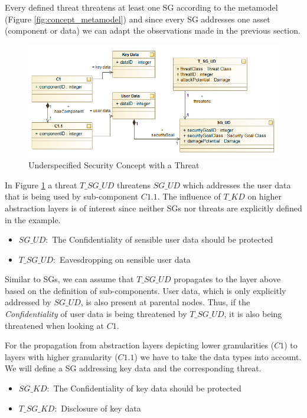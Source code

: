 Every defined threat threatens at least one SG according to the metamodel (Figure \ref{fig:concept_metamodel}) and since every SG addresses one asset (component or data) we can adapt the observations made in the previous section. 

\begin{figure}[H]
\centering
\includegraphics[scale=0.85]{pictures/threat_overview.png}
\caption{Underspecified Security Concept with a Threat}
\label{fig:threat_overview}
\end{figure} 

In Figure \ref{fig:threat_overview} a threat $T\_SG\_UD$ threatens $SG\_UD$ which addresses the user data that is being used by sub-component $C1.1$. The influence of $T\_KD$ on higher abstraction layers is of interest since neither SGs nor threats are explicitly defined in the example.

\begin{itemize}
\item[]\textbf{$SG\_UD:$} The Confidentiality of sensible user data should be protected
\item[]\textbf{$T\_SG\_UD:$} Eavesdropping on sensible user data
\end{itemize}

Similar to SGs, we can assume that $T\_SG\_UD$ propagates to the layer above based on the definition of sub-components. User data, which is only explicitly addressed by $SG\_UD$, is also present at parental nodes. Thus, if the \textit{Confidentiality} of user data is being threatened by $T\_SG\_UD$, it is also being threatened when looking at $C1$.

For the propagation from abstraction layers depicting lower granularities ($C1$) to layers with higher granularity ($C1.1$) we have to take the data types into account. We will define a SG addressing key data and the corresponding threat.

\begin{itemize}
\item[]\textbf{$SG\_KD:$} The Confidentiality of key data should be protected
\item[]\textbf{$T\_SG\_KD:$} Disclosure of key data
\end{itemize}

